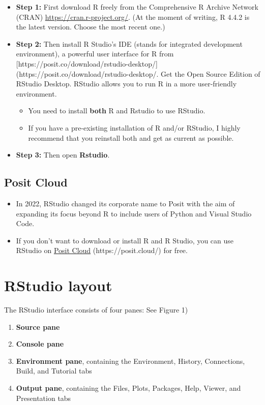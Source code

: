 \documentclass[
  letterpaper,
  DIV=11,
  numbers=noendperiod]{scrreprt}
\begin{document}
\begin{itemize}
\item
  \textbf{Step 1:} First download R freely from the Comprehensive R
  Archive Network (CRAN) \url{https://cran.r-project.org/}. (At the
  moment of writing, R 4.4.2 is the latest version. Choose the most
  recent one.)
\item
  \textbf{Step 2:} Then install R Studio's IDE (stands for integrated
  development environment), a powerful user interface for R from
  {[}https://posit.co/download/rstudio-desktop/{]}(https://posit.co/download/rstudio-desktop/.
  Get the Open Source Edition of RStudio Desktop. RStudio allows you to
  run R in a more user-friendly environment.

  \begin{itemize}
  \item
    You need to install \textbf{both} R and Rstudio to use RStudio.
  \item
    If you have a pre-existing installation of R and/or RStudio, I
    highly recommend that you reinstall both and get as current as
    possible.
  \end{itemize}
\item
  \textbf{Step 3:} Then open \textbf{Rstudio}.
\end{itemize}

\subsection{Posit Cloud}\label{posit-cloud}

\begin{itemize}
\item
  In 2022, RStudio changed its corporate name to Posit with the aim of
  expanding its focus beyond R to include users of Python and Visual
  Studio Code.
\item
  If you don't want to download or install R and R Studio, you can use
  RStudio on \hyperref[posit-cloud]{Posit Cloud} (https://posit.cloud/)
  for free.
\end{itemize}

\section{RStudio layout}\label{rstudio-layout}

The RStudio interface consists of four panes: See Figure 1)

\begin{enumerate}
\def\labelenumi{\arabic{enumi}.}
\item
  \textbf{Source pane}
\item
  \textbf{Console pane}
\item
  \textbf{Environment pane}, containing the Environment, History,
  Connections, Build, and Tutorial tabs
\item
  \textbf{Output pane}, containing the Files, Plots, Packages, Help,
  Viewer, and Presentation tabs
\end{enumerate}
\end{document}
